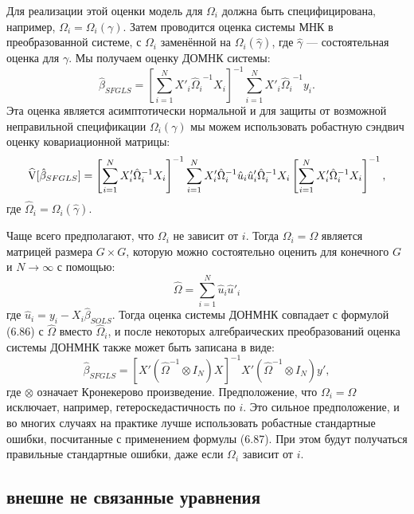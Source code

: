 Для реализации этой оценки модель для $\Omega_i$ должна быть специфицирована, например, $\Omega_i=\Omega_i(\gamma)$. Затем проводится оценка системы МНК в преобразованной системе, с $\Omega_i$ заменённой на $\Omega_i(\hat{\gamma})$, где $\hat{\gamma}$ --- состоятельная оценка для $\gamma$. Мы получаем оценку ДОМНК системы:
\begin{equation}
\hat{\beta}_{SFGLS} = \left[ \sum_{i=1}^N X'_i {\hat{\Omega}_i}^{-1} X_i \right]^{-1} \sum_{i=1}^N X'_i {\hat{\Omega}_i}^{-1} y_i.
\end{equation}
Эта оценка является асимптотически нормальной и для защиты от возможной неправильной спецификации $\Omega_i(\gamma)$ мы можем использовать робастную сэндвич оценку ковариационной матрицы:
\begin{equation}
\widehat{\mathrm{V}}[\hat{\beta}_{SFGLS}]= \left[ \sum_{i=1}^N X'_i {\hat{\Omega}_i}^{-1} X_i \right]^{-1} \sum_{i=1}^N X'_i {\hat{\Omega}_i}^{-1} \hat{u}_i \hat{u}'_i  {\hat{\Omega}_i}^{-1} X_i  \left[ \sum_{i=1}^N X'_i {\hat{\Omega}_i}^{-1} X_i \right]^{-1},
\end{equation}
где $\hat{\Omega}_i=\Omega_i(\hat{\gamma})$.

Чаще всего предполагают, что  $\Omega_i$ не зависит от $i$. Тогда $\Omega_i=\Omega$ является матрицей размера $G \times G$, которую можно состоятельно оценить для конечного $G$ и $N \rightarrow \infty$ с помощью:
\begin{equation}
\hat{\Omega}= \sum_{i=1}^N \hat{u}_i \hat{u}'_i 
\end{equation}
где $\hat{u}_i=y_i-X_i \hat{\beta}_{SOLS}$. Тогда оценка системы ДОНМНК совпадает с формулой (6.86) с $\hat{\Omega}$ вместо $\hat{\Omega}_i$, и после некоторых алгебраических преобразований оценка системы ДОНМНК также может быть записана в виде:
\begin{equation}
\hat{\beta}_{SFGLS} = \left[ X' \left( {\hat{\Omega}}^{-1} \otimes I_N \right) X \right]^{-1} X' \left( {\hat{\Omega}}^{-1} \otimes I_N \right) y',
\end{equation}
где $\otimes$ означает Кронекерово произведение. Предположение, что $\Omega_i=\Omega$ исключает, например, гетероскедастичность по $i$. Это сильное предположение, и во многих случаях на практике лучше использовать робастные стандартные ошибки, посчитанные с применением формулы (6.87). При этом будут получаться  правильные стандартные ошибки, даже если $\Omega_i$ зависит от $i$.

\subsection{внешне не связанные уравнения}


